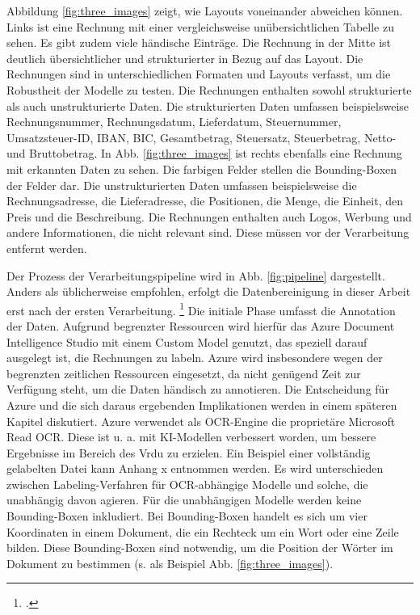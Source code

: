 Abbildung \ref{fig:three_images} zeigt, wie Layouts voneinander abweichen können. Links ist eine Rechnung mit einer vergleichsweise unübersichtlichen Tabelle zu sehen. Es gibt zudem viele händische Einträge. Die Rechnung in der Mitte ist deutlich übersichtlicher und strukturierter in Bezug auf das Layout. Die Rechnungen sind in unterschiedlichen Formaten und Layouts verfasst, um die Robustheit der Modelle zu testen. Die Rechnungen enthalten sowohl strukturierte als auch unstrukturierte Daten. Die strukturierten Daten umfassen beispielsweise Rechnungsnummer, Rechnungsdatum, Lieferdatum, Steuernummer, Umsatzsteuer-ID, IBAN, BIC, Gesamtbetrag, Steuersatz, Steuerbetrag, Netto- und Bruttobetrag. In Abb. \ref{fig:three_images} ist rechts ebenfalls eine Rechnung mit erkannten Daten zu sehen. Die farbigen Felder stellen die Bounding-Boxen der Felder dar. Die unstrukturierten Daten umfassen beispielsweise die Rechnungsadresse, die Lieferadresse, die Positionen, die Menge, die Einheit, den Preis und die Beschreibung. Die Rechnungen enthalten auch Logos, Werbung und andere Informationen, die nicht relevant sind. Diese müssen vor der Verarbeitung entfernt werden.

Der Prozess der Verarbeitungspipeline wird in Abb. \ref{fig:pipeline} dargestellt. Anders als üblicherweise empfohlen, erfolgt die Datenbereinigung in dieser Arbeit erst nach der ersten Verarbeitung. \footcites[Vgl. dazu ausführlich][]{wirth_crisp-dm_2000} Die initiale Phase umfasst die Annotation der Daten. Aufgrund begrenzter Ressourcen wird hierfür das Azure Document Intelligence Studio mit einem Custom Model genutzt, das speziell darauf ausgelegt ist, die Rechnungen zu labeln. Azure wird insbesondere wegen der begrenzten zeitlichen Ressourcen eingesetzt, da nicht genügend Zeit zur Verfügung steht, um die Daten händisch zu annotieren. Die Entscheidung für Azure und die sich daraus ergebenden Implikationen werden in einem späteren Kapitel diskutiert. Azure verwendet als OCR-Engine die proprietäre Microsoft Read OCR. Diese ist u. a. mit KI-Modellen verbessert worden, um bessere Ergebnisse im Bereich des \ac{Vrdu} zu erzielen. Ein Beispiel einer vollständig gelabelten Datei kann Anhang x entnommen werden. Es wird unterschieden zwischen Labeling-Verfahren für OCR-abhängige Modelle und solche, die unabhängig davon agieren. Für die unabhängigen Modelle werden keine Bounding-Boxen inkludiert. Bei Bounding-Boxen handelt es sich um vier Koordinaten in einem Dokument, die ein Rechteck um ein Wort oder eine Zeile bilden. Diese Bounding-Boxen sind notwendig, um die Position der Wörter im Dokument zu bestimmen (s. als Beispiel Abb. \ref{fig:three_images}). 

